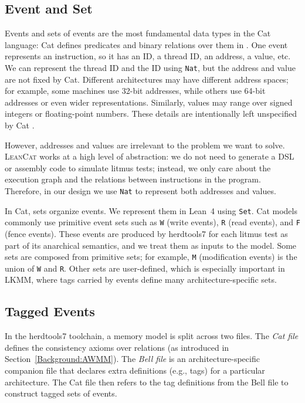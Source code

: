 \subsection{Event and Set}
Events and sets of events are the most fundamental data types in the Cat language: Cat defines predicates and binary relations over them in \citet{catOnlineDocHerd}. One event represents an instruction, so it has an ID, a thread ID, an address, a value, etc. We can represent the thread ID and the ID using \texttt{Nat}, but the address and value are not fixed by Cat. Different architectures may have different address spaces; for example, some machines use 32-bit addresses, while others use 64-bit addresses or even wider representations. Similarly, values may range over signed integers or floating-point numbers. These details are intentionally left unspecified by Cat \citet{catOnlineDocHerd,catManualSyntax11}.

However, addresses and values are irrelevant to the problem we want to solve. \textsc{LeanCat} works at a high level of abstraction: we do not need to generate a DSL or assembly code to simulate litmus tests; instead, we only care about the execution graph and the relations between instructions in the program. Therefore, in our design we use \texttt{Nat} to represent both addresses and values.

In Cat, sets organize events. We represent them in Lean~4 using \texttt{Set}. Cat models commonly use primitive event sets such as \texttt{W} (write events), \texttt{R} (read events), and \texttt{F} (fence events). These events are produced by herdtools7 for each litmus test as part of its anarchical semantics, and we treat them as inputs to the model. Some sets are composed from primitive sets; for example, \texttt{M} (modification events) is the union of \texttt{W} and \texttt{R}. Other sets are user-defined, which is especially important in LKMM, where tags carried by events define many architecture-specific sets.

\subsection{Tagged Events}
\label{subsec:tagged-events}

In the herdtools7 toolchain, a memory model is split across two files. The \emph{Cat file} 
defines the consistency axioms over relations (as introduced in 
Section~\ref{Background:AWMM}). The \emph{Bell file} is an architecture-specific 
companion file that declares extra definitions (e.g., tags) for a particular 
architecture. The Cat file 
then refers to the tag definitions from the Bell file to construct tagged 
sets of events.

